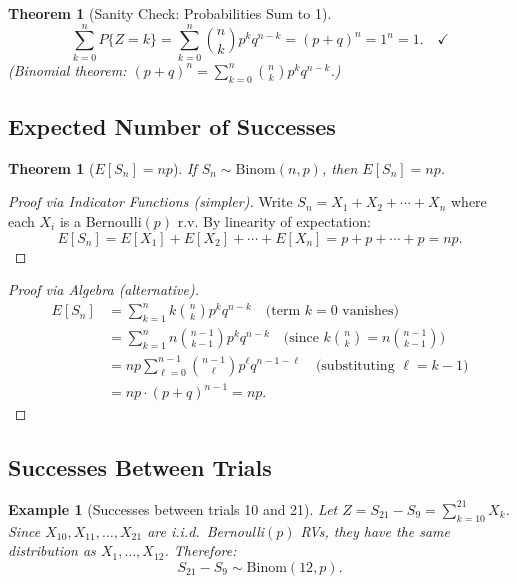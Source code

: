 \documentclass[12pt]{article}
\theoremstyle{definition_style}
\newtheorem{thm}[defn]{Theorem}
\newtheorem{example}[defn]{Example}
\begin{document}
\begin{thm}[Sanity Check: Probabilities Sum to 1]
\[
    \sum_{k=0}^{n} P\{Z = k\} = \sum_{k=0}^{n} \binom{n}{k} p^k q^{n-k} = (p + q)^n = 1^n = 1. \quad \checkmark
\]
(Binomial theorem: $(p+q)^n = \sum_{k=0}^n \binom{n}{k} p^k q^{n-k}$.)
\end{thm}

\subsection{Expected Number of Successes}

\begin{thm}[{$E[S_n] = np$}]
If $S_n \sim \mathrm{Binom}(n, p)$, then $E[S_n] = np$.
\end{thm}

\begin{proof}[Proof via Indicator Functions (simpler)]
Write $S_n = X_1 + X_2 + \cdots + X_n$ where each $X_i$ is a Bernoulli$(p)$ r.v. By linearity of expectation:
\[
    E[S_n] = E[X_1] + E[X_2] + \cdots + E[X_n] = p + p + \cdots + p = np.
\]
\end{proof}

\begin{proof}[Proof via Algebra (alternative)]
\begin{align*}
    E[S_n] &= \sum_{k=1}^{n} k \binom{n}{k} p^k q^{n-k} \quad \text{(term $k=0$ vanishes)} \\
           &= \sum_{k=1}^{n} n \binom{n-1}{k-1} p^k q^{n-k} \quad \text{(since } k\binom{n}{k} = n\binom{n-1}{k-1}\text{)} \\
           &= np \sum_{\ell=0}^{n-1} \binom{n-1}{\ell} p^{\ell} q^{n-1-\ell} \quad \text{(substituting } \ell = k-1\text{)} \\
           &= np \cdot (p+q)^{n-1} = np.
\end{align*}
\end{proof}

\subsection{Successes Between Trials}

\begin{example}[Successes between trials 10 and 21]
Let $Z = S_{21} - S_9 = \sum_{k=10}^{21} X_k$. Since $X_{10}, X_{11}, \ldots, X_{21}$ are i.i.d.\ Bernoulli$(p)$ RVs, they have the same distribution as $X_1, \ldots, X_{12}$. Therefore:
\[
    S_{21} - S_9 \sim \mathrm{Binom}(12, p).
\]
\end{example}
\end{document}
